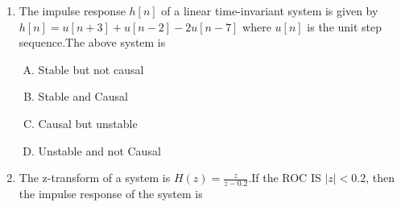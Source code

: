 \documentclass[journal,12pt,twocolumn]{IEEEtran}
\begin{document}
\begin{enumerate}
\item The impulse response $h[n]$ of a linear time-invariant system is given by $h[n]=u[n+3]+u[n-2]-2u[n-7]$ \newline where $u[n]$ is the unit step sequence.The above system is\\
\begin{enumerate}[(A)]
\setlength\itemsep{1em}
\item 
Stable but not causal

\item 
Stable and Causal

\item 
Causal but unstable

\item 
Unstable and not Causal


\end{enumerate}


\item The z-transform of a system is $H(z)=\frac{z}{z-0.2}$.If the ROC IS $|z|<0.2$, then the impulse response of the system is

\begin{enumerate}[(A)]
\end{enumerate}

%
%

%
%
%


\end{enumerate}
\end{document}
